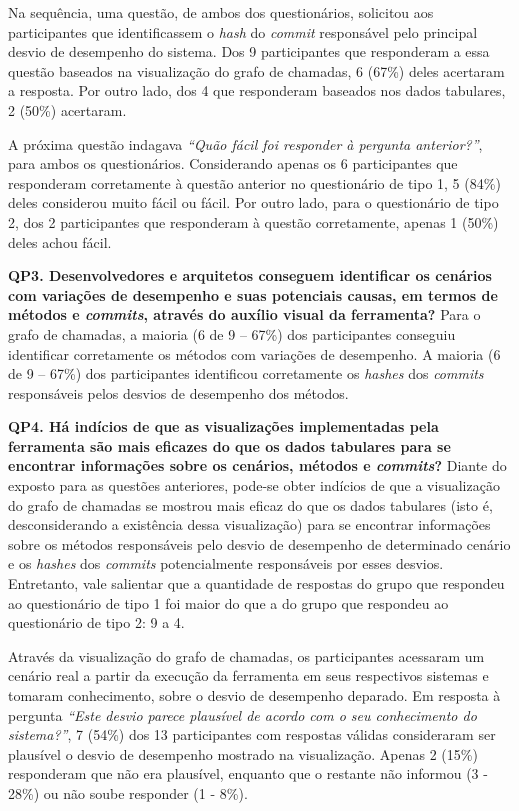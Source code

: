 Na sequência, uma questão, de ambos dos questionários, solicitou aos participantes que identificassem o \textit{hash} do \textit{commit} responsável pelo principal desvio de desempenho do sistema. Dos 9 participantes que responderam a essa questão baseados na visualização do grafo de chamadas, 6 (67\%) deles acertaram a resposta. Por outro lado, dos 4 que responderam baseados nos dados tabulares, 2 (50\%) acertaram.

A próxima questão indagava \textit{``Quão fácil foi responder à pergunta anterior?''}, para ambos os questionários. Considerando apenas os 6 participantes que responderam corretamente à questão anterior no questionário de tipo 1, 5 (84\%) deles considerou muito fácil ou fácil. Por outro lado, para o questionário de tipo 2, dos 2 participantes que responderam à questão corretamente, apenas 1 (50\%) deles achou fácil.

\begin{framed}
\noindent \textbf{QP3. Desenvolvedores e arquitetos conseguem identificar os cenários com variações de desempenho e suas potenciais causas, em termos de métodos e \textit{commits}, através do auxílio visual da ferramenta?} Para o grafo de chamadas, a maioria (6 de 9 -- 67\%) dos participantes conseguiu identificar corretamente os métodos com variações de desempenho. A maioria (6 de 9 -- 67\%) dos participantes identificou corretamente os \textit{hashes} dos \textit{commits} responsáveis pelos desvios de desempenho dos métodos.
\end{framed}

\begin{framed}
\noindent \textbf{QP4. Há indícios de que as visualizações implementadas pela ferramenta são mais eficazes do que os dados tabulares para se encontrar informações sobre os cenários, métodos e \textit{commits}?} Diante do exposto para as questões anteriores, pode-se obter indícios de que a visualização do grafo de chamadas se mostrou mais eficaz do que os dados tabulares (isto é, desconsiderando a existência dessa visualização) para se encontrar informações sobre os métodos responsáveis pelo desvio de desempenho de determinado cenário e os \textit{hashes} dos \textit{commits} potencialmente responsáveis por esses desvios. Entretanto, vale salientar que a quantidade de respostas do grupo que respondeu ao questionário de tipo 1 foi maior do que a do grupo que respondeu ao questionário de tipo 2: 9 a 4.
\end{framed}

Através da visualização do grafo de chamadas, os participantes acessaram um cenário real a partir da execução da ferramenta em seus respectivos sistemas e tomaram conhecimento, sobre o desvio de desempenho deparado. Em resposta à pergunta \textit{``Este desvio parece plausível de acordo com o seu conhecimento do sistema?''}, 7 (54\%) dos 13 participantes com respostas válidas consideraram ser plausível o desvio de desempenho mostrado na visualização. Apenas 2 (15\%) responderam que não era plausível, enquanto que o restante não informou (3 - 28\%) ou não soube responder (1 - 8\%).

